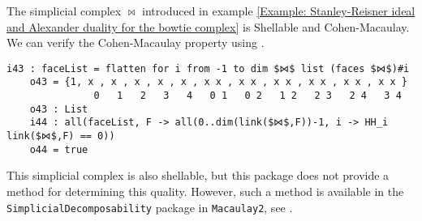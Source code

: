 \documentclass[12pt,leqno]{amsart}
\theoremstyle{definition}
\newenvironment{example}
{\pushQED{\qed}\renewcommand{\qedsymbol}{$\diamond$}\examplex}
{\popQED\endexamplex}
\begin{document}
\begin{example}\label{Example: Shellability, the Cohen-Macaulay property, and the h-vector}
  The simplicial complex $\bowtie$ introduced in example \ref{Example: Stanley-Reisner ideal and Alexander duality for the bowtie complex} is Shellable and Cohen-Macaulay. We can verify the Cohen-Macaulay property using \cite[Corollary 5.3.9]{BH}.
\begin{lstlisting}[basicstyle={\ttfamily \scriptsize}, xleftmargin=-23pt]
    i43 : faceList = flatten for i from -1 to dim $⋈$ list (faces $⋈$)#i
    o43 = {1, x , x , x , x , x , x x , x x , x x , x x , x x , x x }
               0   1   2   3   4   0 1   0 2   1 2   2 3   2 4   3 4
    o43 : List
    i44 : all(faceList, F -> all(0..dim(link($⋈$,F))-1, i -> HH_i link($⋈$,F) == 0))
    o44 = true
\end{lstlisting}
  This simplicial complex is also shellable, but this package does not provide a method for determining this quality. However, such a method is available in the \texttt{SimplicialDecomposability} package in \texttt{Macaulay2}, see \cite{Cook}.


\end{example}
\end{document}
